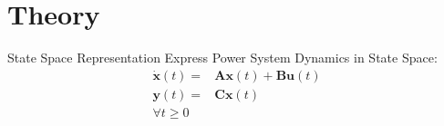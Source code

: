 \section[Theory]{Theory}
\label{sec:lasso_theory}

\begin{frame}[fragile]{State Space Representation}
	Express Power System Dynamics in State Space:
	\begin{equation}
		\label{eq:ssr}
		\begin{align}
			\dot{\textbf{x}}(t) = 
			& \textbf{A}\textbf{x}(t)
			+ \textbf{B}\textbf{u}(t)\\
			\textbf{y}(t) = 
			& \textbf{C}\textbf{x}(t)\\  
			\forall t\geq0
		\end{align}
	\end{equation}
\end{frame}
